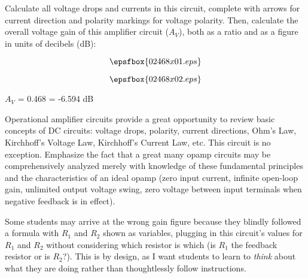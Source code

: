 

Calculate all voltage drops and currents in this circuit, complete with arrows for current direction and polarity markings for voltage polarity.  Then, calculate the overall voltage gain of this amplifier circuit ($A_V$), both as a ratio and as a figure in units of decibels (dB):

$$\epsfbox{02468x01.eps}$$







$$\epsfbox{02468x02.eps}$$

$A_V$ = 0.468 = -6.594 dB







Operational amplifier circuits provide a great opportunity to review basic concepts of DC circuits: voltage drops, polarity, current directions, Ohm's Law, Kirchhoff's Voltage Law, Kirchhoff's Current Law, etc.  This circuit is no exception.  Emphasize the fact that a great many opamp circuits may be comprehensively analyzed merely with knowledge of these fundamental principles and the characteristics of an ideal opamp (zero input current, infinite open-loop gain, unlimited output voltage swing, zero voltage between input terminals when negative feedback is in effect).

Some students may arrive at the wrong gain figure because they blindly followed a formula with $R_1$ and $R_2$ shown as variables, plugging in this circuit's values for $R_1$ and $R_2$ without considering which resistor is which (is $R_1$ the feedback resistor or is $R_2$?).  This is by design, as I want students to learn to {\it think} about what they are doing rather than thoughtlessly follow instructions.




